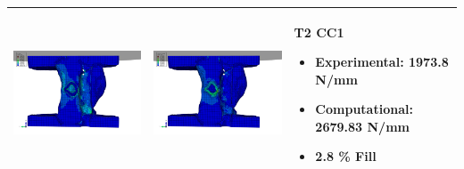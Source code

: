 \documentclass[11pt,a4paper]{article}
\begin{document}
\begin{landscape}
\begin{longtable}{|m{11cm}|m{11cm}|m{4cm}|}
\includegraphics[width=10cm]{images/T2_CC1_postVP_Interface_ABAQUS_All_Side_Stress.png}   & \includegraphics[width=10cm]{images/T2_CC1_postVP_Interface_ABAQUS_All_Side_Strain.png}   & T2 CC1  \begin{itemize} \item Experimental: 	1973.8	N/mm \item Computational:	2679.83 N/mm \item 2.8 \% Fill \end{itemize} \\ \hline 

\end{longtable}
\end{landscape}
\end{document}
